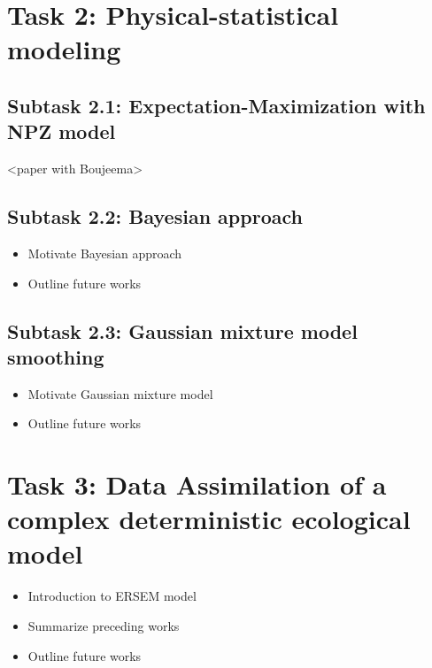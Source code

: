 	\section{Task 2: Physical-statistical modeling}
	\label{physstat}

		\subsection{Subtask 2.1: Expectation-Maximization with NPZ model}
		\label{physstat:EM}

			<paper with Boujeema>

		\subsection{Subtask 2.2: Bayesian approach}
		\label{physstat:bayes}

			\begin{itemize}
				\item Motivate Bayesian approach
				\item Outline future works
			\end{itemize}

		\subsection{Subtask 2.3: Gaussian mixture model smoothing}
		\label{physstat:GM}

			\begin{itemize}
				\item Motivate Gaussian mixture model
				\item Outline future works
			\end{itemize}

	\section{Task 3: Data Assimilation of a complex deterministic ecological model}
	\label{moddriv}

		\begin{itemize}
			\item Introduction to ERSEM model
			\item Summarize preceding works
			\item Outline future works
		\end{itemize}
